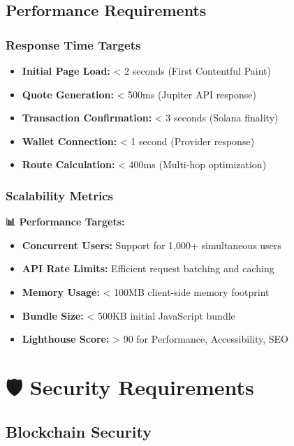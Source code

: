 \documentclass[12pt,a4paper]{article}
\begin{document}
\subsection{Performance Requirements}

\subsubsection{Response Time Targets}

\begin{itemize}
    \item \textbf{Initial Page Load:} < 2 seconds (First Contentful Paint)
    \item \textbf{Quote Generation:} < 500ms (Jupiter API response)
    \item \textbf{Transaction Confirmation:} < 3 seconds (Solana finality)
    \item \textbf{Wallet Connection:} < 1 second (Provider response)
    \item \textbf{Route Calculation:} < 400ms (Multi-hop optimization)
\end{itemize}

\subsubsection{Scalability Metrics}

\begin{tcolorbox}[colback=successGreen!10,colframe=successGreen]
\textbf{📊 Performance Targets:}
\begin{itemize}
    \item \textbf{Concurrent Users:} Support for 1,000+ simultaneous users
    \item \textbf{API Rate Limits:} Efficient request batching and caching
    \item \textbf{Memory Usage:} < 100MB client-side memory footprint
    \item \textbf{Bundle Size:} < 500KB initial JavaScript bundle
    \item \textbf{Lighthouse Score:} > 90 for Performance, Accessibility, SEO
\end{itemize}
\end{tcolorbox}

\section{🛡️ Security Requirements}

\subsection{Blockchain Security}
\end{document}
